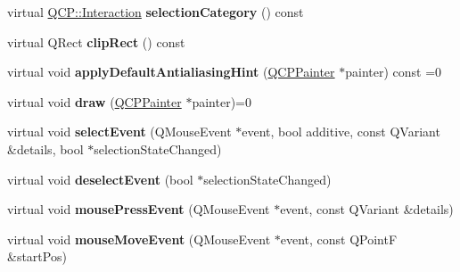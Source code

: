 \begin{DoxyCompactItemize}
\item 
virtual \hyperlink{namespace_q_c_p_a2ad6bb6281c7c2d593d4277b44c2b037}{Q\+C\+P\+::\+Interaction} {\bfseries selection\+Category} () const \hypertarget{class_q_c_p_layerable_a85bd25ac9be0f0eefc3f0722b83216e5}{}\label{class_q_c_p_layerable_a85bd25ac9be0f0eefc3f0722b83216e5}

\item 
virtual Q\+Rect {\bfseries clip\+Rect} () const \hypertarget{class_q_c_p_layerable_a34c6bbed3bf011123e96695e17f8fba6}{}\label{class_q_c_p_layerable_a34c6bbed3bf011123e96695e17f8fba6}

\item 
virtual void {\bfseries apply\+Default\+Antialiasing\+Hint} (\hyperlink{class_q_c_p_painter}{Q\+C\+P\+Painter} $\ast$painter) const =0\hypertarget{class_q_c_p_layerable_a1168944abbf9fa6731b0f4a2d0d67e8b}{}\label{class_q_c_p_layerable_a1168944abbf9fa6731b0f4a2d0d67e8b}

\item 
virtual void {\bfseries draw} (\hyperlink{class_q_c_p_painter}{Q\+C\+P\+Painter} $\ast$painter)=0\hypertarget{class_q_c_p_layerable_adf62b4bac3ca934db80290792fc897e1}{}\label{class_q_c_p_layerable_adf62b4bac3ca934db80290792fc897e1}

\item 
virtual void {\bfseries select\+Event} (Q\+Mouse\+Event $\ast$event, bool additive, const Q\+Variant \&details, bool $\ast$selection\+State\+Changed)\hypertarget{class_q_c_p_layerable_a0ff16be287fca7c237070ed821e921db}{}\label{class_q_c_p_layerable_a0ff16be287fca7c237070ed821e921db}

\item 
virtual void {\bfseries deselect\+Event} (bool $\ast$selection\+State\+Changed)\hypertarget{class_q_c_p_layerable_a86e627b6b03aea7202b65328bd150936}{}\label{class_q_c_p_layerable_a86e627b6b03aea7202b65328bd150936}

\item 
virtual void {\bfseries mouse\+Press\+Event} (Q\+Mouse\+Event $\ast$event, const Q\+Variant \&details)\hypertarget{class_q_c_p_layerable_a0295d5eb32e429bd1a9845e4fe889a93}{}\label{class_q_c_p_layerable_a0295d5eb32e429bd1a9845e4fe889a93}

\item 
virtual void {\bfseries mouse\+Move\+Event} (Q\+Mouse\+Event $\ast$event, const Q\+PointF \&start\+Pos)\hypertarget{class_q_c_p_layerable_afd4d5359773fc5f479bcd6c5bb7d9711}{}\label{class_q_c_p_layerable_afd4d5359773fc5f479bcd6c5bb7d9711}


\end{DoxyCompactItemize}
